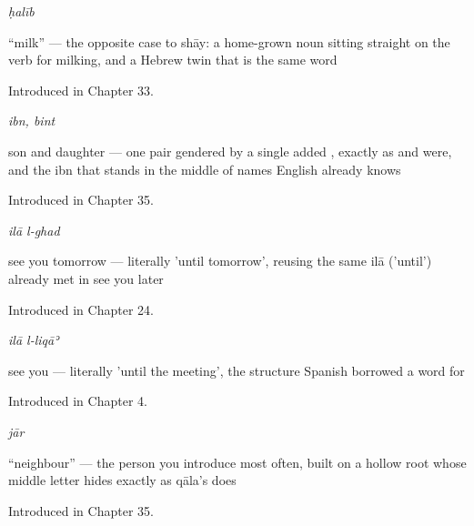 \noindent\begin{minipage}[t]{\linewidth}
\raggedright
\textbf{}\enspace\emph{ḥalīb}\par
\small \textquotedblleft{}milk\textquotedblright{} — the opposite case to shāy: a home-grown noun sitting straight on the verb for milking, and a Hebrew twin that is the same word\par
\footnotesize Introduced in Chapter 33.
\end{minipage}\par\medskip

\noindent\begin{minipage}[t]{\linewidth}
\raggedright
\textbf{ }\enspace\emph{ibn, bint}\par
\small son and daughter — one pair gendered by a single added , exactly as  and  were, and the ibn that stands in the middle of names English already knows\par
\footnotesize Introduced in Chapter 35.
\end{minipage}\par\medskip

\noindent\begin{minipage}[t]{\linewidth}
\raggedright
\textbf{ }\enspace\emph{ilā l-ghad}\par
\small see you tomorrow — literally 'until tomorrow', reusing the same ilā ('until') already met in see you later\par
\footnotesize Introduced in Chapter 24.
\end{minipage}\par\medskip

\noindent\begin{minipage}[t]{\linewidth}
\raggedright
\textbf{ }\enspace\emph{ilā l-liqāʾ}\par
\small see you — literally 'until the meeting', the structure Spanish borrowed a word for\par
\footnotesize Introduced in Chapter 4.
\end{minipage}\par\medskip

\noindent\begin{minipage}[t]{\linewidth}
\raggedright
\textbf{}\enspace\emph{jār}\par
\small \textquotedblleft{}neighbour\textquotedblright{} — the person you introduce most often, built on a hollow root whose middle letter hides exactly as qāla's does\par
\footnotesize Introduced in Chapter 35.
\end{minipage}\par\medskip

